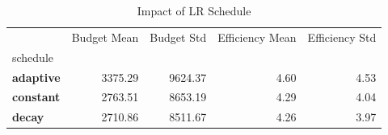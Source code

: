 \begin{table}
\caption{Impact of LR Schedule}
\label{tab:schedule}
\begin{tabular}{lrrrr}
\toprule
 & Budget Mean & Budget Std & Efficiency Mean & Efficiency Std \\
schedule &  &  &  &  \\
\midrule
\textbf{adaptive} & 3375.29 & 9624.37 & 4.60 & 4.53 \\
\textbf{constant} & 2763.51 & 8653.19 & 4.29 & 4.04 \\
\textbf{decay} & 2710.86 & 8511.67 & 4.26 & 3.97 \\
\bottomrule
\end{tabular}
\end{table}
